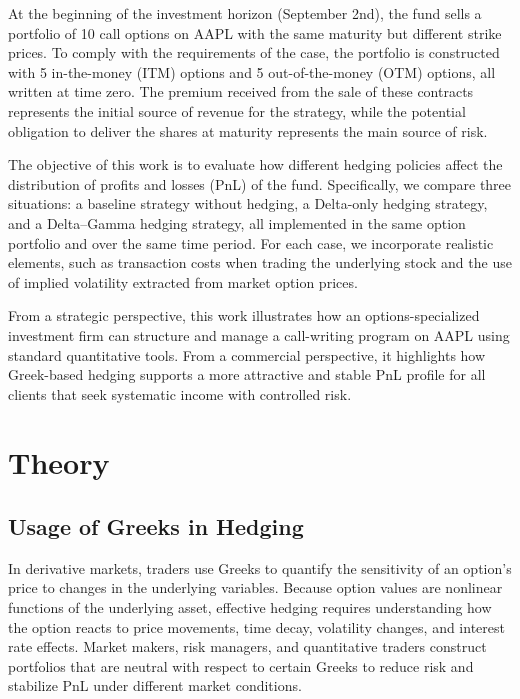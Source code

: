 \documentclass{article}
\begin{document}
At the beginning of the investment horizon (September 2nd), the fund sells a portfolio of 10 call options on AAPL with the same maturity but different strike prices. To comply with the requirements of the case, the portfolio is constructed with 5 in-the-money (ITM) options and 5 out-of-the-money (OTM) options, all written at time zero. The premium received from the sale of these contracts represents the initial source of revenue for the strategy, while the potential obligation to deliver the shares at maturity represents the main source of risk.

The objective of this work is to evaluate how different hedging policies affect the distribution of profits and losses (PnL) of the fund. Specifically, we compare three situations: a baseline strategy without hedging, a Delta-only hedging strategy, and a Delta–Gamma hedging strategy, all implemented in the same option portfolio and over the same time period. For each case, we incorporate realistic elements, such as transaction costs when trading the underlying stock and the use of implied volatility extracted from market option prices.

From a strategic perspective, this work illustrates how an options-specialized investment firm can structure and manage a call-writing program on AAPL using standard quantitative tools. From a commercial perspective, it highlights how Greek-based hedging supports a more attractive and stable PnL profile for all clients that seek systematic income with controlled risk.

\newpage

\section{Theory}

\subsection{Usage of Greeks in Hedging}

In derivative markets, traders use Greeks to quantify the sensitivity of an option’s price to changes in the underlying variables. Because option values are nonlinear functions of the underlying asset, effective hedging requires understanding how the option reacts to price movements, time decay, volatility changes, and interest rate effects. Market makers, risk managers, and quantitative traders construct portfolios that are neutral with respect to certain Greeks to reduce risk and stabilize PnL under different market conditions.
\end{document}
